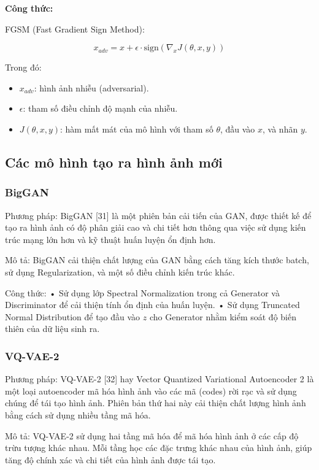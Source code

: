 \documentclass[12pt]{report}
\begin{document}
\textbf{Công thức:}

FGSM (Fast Gradient Sign Method):

\[
x_{adv} = x + \epsilon \cdot \text{sign}(\nabla_x J(\theta, x, y))
\]

Trong đó:
\begin{itemize}
    \item \( x_{adv} \): hình ảnh nhiễu (adversarial).
    \item \( \epsilon \): tham số điều chỉnh độ mạnh của nhiễu.
    \item \( J(\theta, x, y) \): hàm mất mát của mô hình với tham số \( \theta \), đầu vào \( x \), và nhãn \( y \).
\end{itemize}
\subsection{Các mô hình tạo ra hình ảnh mới}

\subsubsection{BigGAN}

Phương pháp:  
BigGAN [31] là một phiên bản cải tiến của GAN, được thiết kế để tạo ra hình ảnh có độ phân giải cao và chi tiết hơn thông qua việc sử dụng kiến trúc mạng lớn hơn và kỹ thuật huấn luyện ổn định hơn.  

Mô tả:  
BigGAN cải thiện chất lượng của GAN bằng cách tăng kích thước batch, sử dụng Regularization, và một số điều chỉnh kiến trúc khác.  

Công thức:  
• Sử dụng lớp Spectral Normalization trong cả Generator và Discriminator để cải thiện tính ổn định của huấn luyện.  
• Sử dụng Truncated Normal Distribution để tạo đầu vào \( z \) cho Generator nhằm kiểm soát độ biến thiên của dữ liệu sinh ra.

\subsubsection{VQ-VAE-2}

Phương pháp:  
VQ-VAE-2 [32] hay Vector Quantized Variational Autoencoder 2 là một loại autoencoder mã hóa hình ảnh vào các mã (codes) rời rạc và sử dụng chúng để tái tạo hình ảnh. Phiên bản thứ hai này cải thiện chất lượng hình ảnh bằng cách sử dụng nhiều tầng mã hóa.  

Mô tả:  
VQ-VAE-2 sử dụng hai tầng mã hóa để mã hóa hình ảnh ở các cấp độ trừu tượng khác nhau. Mỗi tầng học các đặc trưng khác nhau của hình ảnh, giúp tăng độ chính xác và chi tiết của hình ảnh được tái tạo.  
\end{document}
